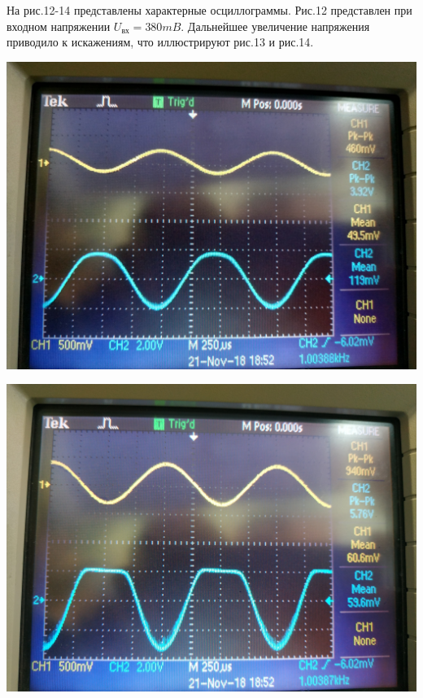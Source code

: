 На рис.12-14 представлены характерные осциллограммы. Рис.12 представлен при входном напряжении $U_{\text{вх}}=380 mB$. Дальнейшее увеличение напряжения приводило к искажениям, что иллюстрируют рис.13 и рис.14.
\begin{center}
    \begin{minipage}{0.3\linewidth}
        \includegraphics[width=\linewidth]{fig/fig11norma} 
        \vspace{-20pt}
        \label{fig:12}
    \end{minipage}
\hfill     
    \begin{minipage}{0.3\linewidth}
        \centering
        \includegraphics[width=\linewidth]{fig/fig10iskajeniya}  

\end{minipage}
\end{center}
